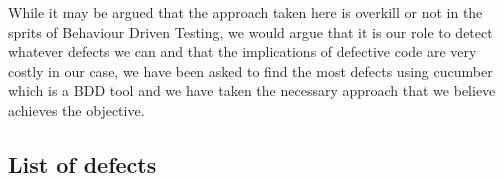\documentclass[11pt]{article}
\begin{document}
While it may be argued that the approach taken here is overkill or not in the sprits of Behaviour Driven Testing, we would argue that it is our role to detect whatever defects we can and that the implications of defective code are very costly in our case, we have been asked to find the most defects using cucumber which is a BDD tool and we have taken the necessary approach that we believe achieves the objective. 


\subsection{List of defects}






\end{document}
